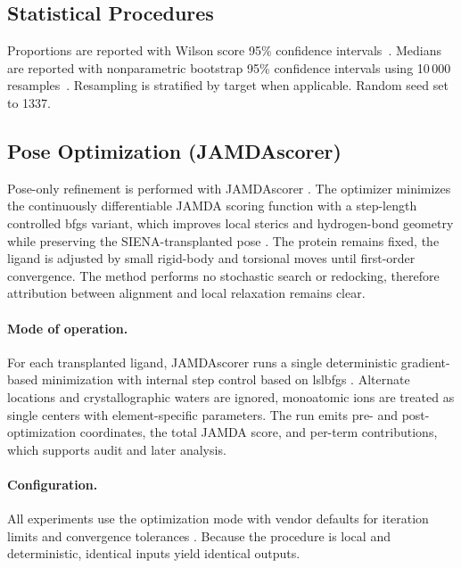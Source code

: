 \subsection{Statistical Procedures}
Proportions are reported with Wilson score 95\% confidence intervals~\cite{wilsonProbableInferenceLaw1927a}. Medians are reported with nonparametric bootstrap 95\% confidence intervals using 10\,000 resamples~\cite{efronBootstrapMethodsAnother1979,efronIntroductionBootstrap1998}. Resampling is stratified by target when applicable. Random seed set to 1337.

\subsection{Pose Optimization (JAMDAscorer)}\label{subsec:jamda}
Pose-only refinement is performed with JAMDAscorer \cite{flachsenbergConsistentSchemeGradientBased2020b,JAMDAscorer}. The optimizer minimizes the continuously differentiable JAMDA scoring function with a step-length controlled \gls{bfgs} variant, which improves local sterics and hydrogen-bond geometry while preserving the SIENA-transplanted pose \cite{flachsenbergConsistentSchemeGradientBased2020b}. The protein remains fixed, the ligand is adjusted by small rigid-body and torsional moves until first-order convergence. The method performs no stochastic search or redocking, therefore attribution between alignment and local relaxation remains clear.

\paragraph{Mode of operation.}
For each transplanted ligand, JAMDAscorer runs a single deterministic gradient-based minimization with internal step control based on \gls{lslbfgs} \cite{flachsenbergLSLOptOpensourceImplementation2021}. Alternate locations and crystallographic waters are ignored, monoatomic ions are treated as single centers with element-specific parameters. The run emits pre- and post-optimization coordinates, the total JAMDA score, and per-term contributions, which supports audit and later analysis.

\paragraph{Configuration.}
All experiments use the optimization mode with vendor defaults for iteration limits and convergence tolerances \cite{flachsenbergConsistentSchemeGradientBased2020b}. Because the procedure is local and deterministic, identical inputs yield identical outputs.

